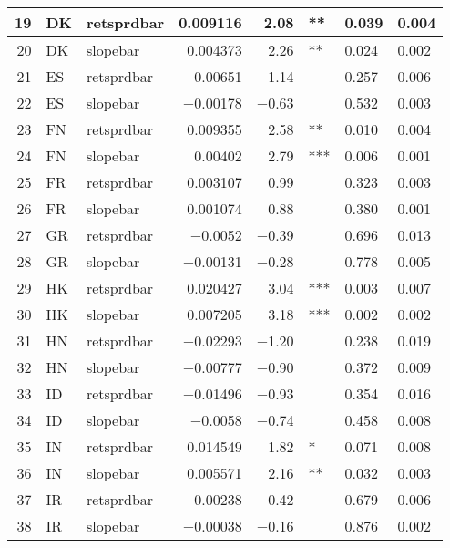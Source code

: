 \begin{longtable}{|r|l|l|r|r|l|l|l|}
   19 &    DK &    retsprdbar &    0.009116 &    2.08 &    ** &    0.039 &    0.004\\\hline
   20 &    DK &    slopebar &    0.004373 &    2.26 &    ** &    0.024 &    0.002\\\hline
   21 &    ES &    retsprdbar &    $-$0.00651 &    $-$1.14 &      &    0.257 &    0.006\\\hline
   22 &    ES &    slopebar &    $-$0.00178 &    $-$0.63 &      &    0.532 &    0.003\\\hline
   23 &    FN &    retsprdbar &    0.009355 &    2.58 &    ** &    0.010 &    0.004\\\hline
   24 &    FN &    slopebar &    0.00402 &    2.79 &    *** &    0.006 &    0.001\\\hline
   25 &    FR &    retsprdbar &    0.003107 &    0.99 &      &    0.323 &    0.003\\\hline
   26 &    FR &    slopebar &    0.001074 &    0.88 &      &    0.380 &    0.001\\\hline
   27 &    GR &    retsprdbar &    $-$0.0052 &    $-$0.39 &      &    0.696 &    0.013\\\hline
   28 &    GR &    slopebar &    $-$0.00131 &    $-$0.28 &      &    0.778 &    0.005\\\hline
   29 &    HK &    retsprdbar &    0.020427 &    3.04 &    *** &    0.003 &    0.007\\\hline
   30 &    HK &    slopebar &    0.007205 &    3.18 &    *** &    0.002 &    0.002\\\hline
   31 &    HN &    retsprdbar &    $-$0.02293 &    $-$1.20 &      &    0.238 &    0.019\\\hline
   32 &    HN &    slopebar &    $-$0.00777 &    $-$0.90 &      &    0.372 &    0.009\\\hline
   33 &    ID &    retsprdbar &    $-$0.01496 &    $-$0.93 &      &    0.354 &    0.016\\\hline
   34 &    ID &    slopebar &    $-$0.0058 &    $-$0.74 &      &    0.458 &    0.008\\\hline
   35 &    IN &    retsprdbar &    0.014549 &    1.82 &    * &    0.071 &    0.008\\\hline
   36 &    IN &    slopebar &    0.005571 &    2.16 &    ** &    0.032 &    0.003\\\hline
   37 &    IR &    retsprdbar &    $-$0.00238 &    $-$0.42 &      &    0.679 &    0.006\\\hline
   38 &    IR &    slopebar &    $-$0.00038 &    $-$0.16 &      &    0.876 &    0.002\\\hline

\end{longtable}
